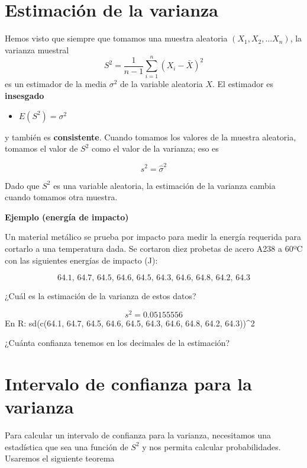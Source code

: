 \documentclass[
]{book}
\providecommand{\tightlist}{%
  \setlength{\itemsep}{0pt}\setlength{\parskip}{0pt}}
\begin{document}
\hypertarget{estimaciuxf3n-de-la-varianza}{%
\section{Estimación de la varianza}\label{estimaciuxf3n-de-la-varianza}}

Hemos visto que siempre que tomamos una muestra aleatoria \((X_1, X_2, ... X_n)\), la varianza muestral
\[S^2=\frac{1}{n-1}\sum_{i=1}^n (X_i-\bar{X})^2\]
es un estimador de la media \(\sigma^2\) de la variable aleatoria \(X\). El estimador es \textbf{insesgado}

\begin{itemize}
\tightlist
\item
  \(E(S^2)=\sigma^2\)
\end{itemize}

y también es \textbf{consistente}. Cuando tomamos los valores de la muestra aleatoria, tomamos el valor de \(S^2\) como el valor de la varianza; eso es

\[s^2=\hat{\sigma}^2\]

Dado que \(S^2\) es una variable aleatoria, la estimación de la varianza cambia cuando tomamos otra muestra.

\textbf{Ejemplo (energía de impacto)}

Un material metálico se prueba por impacto para medir la energía requerida para cortarlo a una temperatura dada. Se cortaron diez probetas de acero A238 a 60ºC con las siguientes energías de impacto (J):

\[64.1,\, 64.7,\, 64.5,\, 64.6,\, 64.5,\, 64.3,\, 64.6,\, 64.8,\, 64.2,\, 64.3\]

¿Cuál es la estimación de la varianza de estos datos?

\[s^2=0.05155556\]
En R: sd(c(64.1, 64.7, 64.5, 64.6, 64.5, 64.3, 64.6, 64.8, 64.2, 64.3))\^{}2

¿Cuánta confianza tenemos en los decimales de la estimación?

\hypertarget{intervalo-de-confianza-para-la-varianza}{%
\section{Intervalo de confianza para la varianza}\label{intervalo-de-confianza-para-la-varianza}}

Para calcular un intervalo de confianza para la varianza, necesitamos una estadística que sea una función de \(S^2\) y nos permita calcular probabilidades. Usaremos el siguiente teorema
\end{document}
